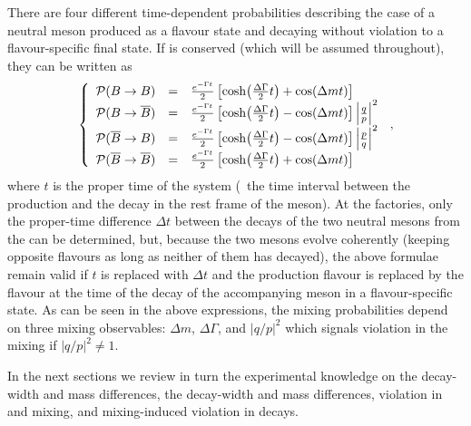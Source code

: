 There are four different time-dependent probabilities describing the 
case of a neutral \B meson produced as a flavour state and decaying without
\CP violation to a flavour-specific final state. 
If \CPT is conserved (which  
will be assumed throughout), they can be written as 
\begin{equation}
\left\{
\begin{array}{rcl}
{\cal P}(\B\to\B) & = &  \frac{e^{-\Gamma t}}{2} 
\left[ \cosh\!\left(\frac{\Delta\Gamma}{2}t\right) + \cos\!\left(\Delta m t\right)\right]  \\
{\cal P}(\B\to\bar{\B}) & = &  \frac{e^{-\Gamma t}}{2} 
\left[ \cosh\!\left(\frac{\Delta\Gamma}{2}t\right) - \cos\!\left(\Delta m t\right)\right] 
\left|\frac{q}{p}\right|^2 \\
{\cal P}(\bar{\B}\to\B) & = &  \frac{e^{-\Gamma t}}{2} 
\left[ \cosh\!\left(\frac{\Delta\Gamma}{2}t\right) - \cos\!\left(\Delta m t\right)\right] 
\left|\frac{p}{q}\right|^2 \\
{\cal P}(\bar{\B}\to\bar{\B}) & = &  \frac{e^{-\Gamma t}}{2} 
\left[ \cosh\!\left(\frac{\Delta\Gamma}{2}t\right) + \cos\!\left(\Delta m t\right)\right] 
\end{array} \right. \,,
\labe{oscillations}
\end{equation}
where $t$ is the proper time of the system (\ie\ the time interval between the production 
and the decay in the rest frame of the \B meson). 
At the \B factories, only the proper-time difference $\Delta t$ between the decays
of the two neutral \B mesons from the \Ups can be determined, but, 
because the two \B mesons evolve coherently (keeping opposite flavours as long
as neither of them has decayed), the 
above formulae remain valid 
if $t$ is replaced with $\Delta t$ and the production flavour is replaced by the flavour 
at the time of the decay of the accompanying \B meson in a flavour-specific state.
As can be seen in the above expressions,
the mixing probabilities 
depend on three mixing observables:
$\Delta m$, $\Delta\Gamma$,
and $|q/p|^2$ which signals \CP violation in the mixing if $|q/p|^2 \ne 1$.

In the next sections we review in turn the experimental knowledge
on the \Bd decay-width and mass differences, 
the \Bs decay-width and mass differences,  
\CP violation in \Bd and \Bs mixing, and mixing-induced \CP violation in \Bs decays. 

